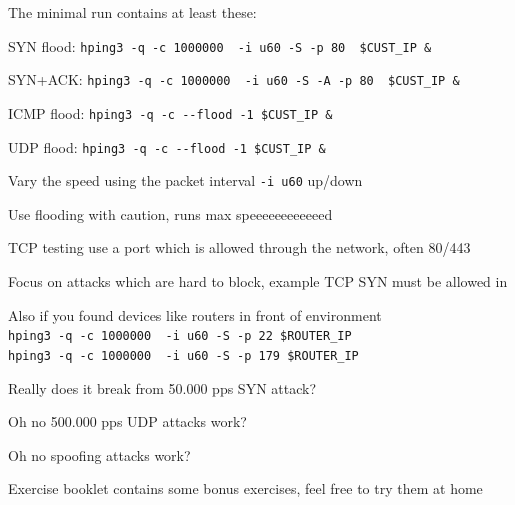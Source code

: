 \documentclass[Screen16to9,17pt]{foils}
\begin{document}
\begin{list1}
\item The minimal run contains at least these:
\begin{list2}
\item SYN flood: \verb+hping3 -q -c 1000000  -i u60 -S -p 80  $CUST_IP &+
\item SYN+ACK: \verb+hping3 -q -c 1000000  -i u60 -S -A -p 80  $CUST_IP &+
\item ICMP flood: \verb+hping3 -q -c --flood -1 $CUST_IP &+
\item UDP flood: \verb+hping3 -q -c --flood -1 $CUST_IP &+
\end{list2}
\item Vary the speed using the packet interval \verb+-i u60+ up/down
\item Use flooding with caution, runs max speeeeeeeeeeeed \smiley
\item TCP testing use a port which is allowed through the network, often 80/443
\item Focus on attacks which are hard to block, example TCP SYN must be allowed in
\item Also if you found devices like routers in front of environment\\
\verb+hping3 -q -c 1000000  -i u60 -S -p 22 $ROUTER_IP+\\
\verb+hping3 -q -c 1000000  -i u60 -S -p 179 $ROUTER_IP+
\end{list1}



\centerline{Really does it break from 50.000 pps SYN attack?}



\centerline{Oh no 500.000 pps UDP attacks work?}


\centerline{Oh no spoofing attacks work?}






Exercise booklet contains some bonus exercises, feel free to try them at home
\end{document}
